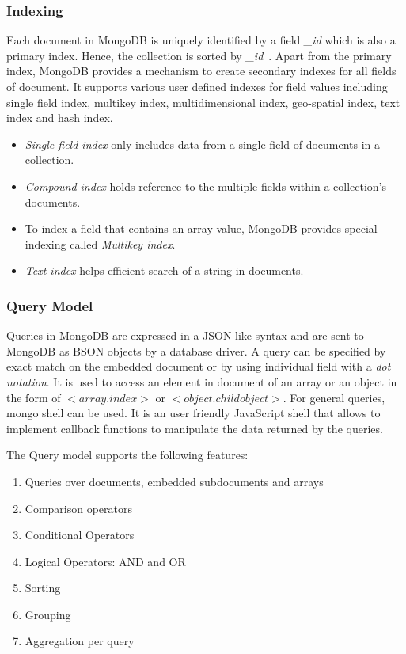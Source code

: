 \subsubsection{Indexing}\label{mong-xmark-indexing}
Each document in MongoDB is uniquely identified by a field \textit{\_id} which is also a primary index. Hence, the collection is sorted by \textit{\_id}~\citep{nosql/comparision}.
Apart from the primary index, MongoDB provides a mechanism to create secondary indexes for all fields of document. It supports various user defined indexes for field values including single field index, multikey index, multidimensional index, geo-spatial index, text index and hash index.
\begin{itemize}
\item \textit{Single field index} only includes data from a single field of documents in a collection. 
\item \textit{Compound index} holds reference to the multiple fields within a collection's documents.
\item To index a field that contains an array value, MongoDB provides special indexing called \textit{Multikey index}.
\item \textit{Text index} helps efficient search of a string in documents.
\end{itemize}
\subsubsection{Query Model}%
Queries in MongoDB are expressed in a JSON-like syntax and are sent to MongoDB as BSON objects by a database driver\citep{orend2010analysis}. A query can be specified by exact match on the embedded document or by using individual field with a \textit{dot notation}. It is used to access an element in document of an array or an object in the form of  $<$$array$.$index$$>$ or  $<$$object$.$childobject$$>$. For general queries, mongo shell can be used. It is an user friendly JavaScript shell that allows to implement callback functions to manipulate the data returned by the  queries.  
\par
The Query model supports the following features:
\begin{enumerate}
	\item Queries over documents, embedded subdocuments and arrays
	\item Comparison operators
	\item Conditional Operators
	\item Logical Operators: AND and OR
	\item Sorting 
	\item Grouping
	\item Aggregation per query
\end{enumerate}

